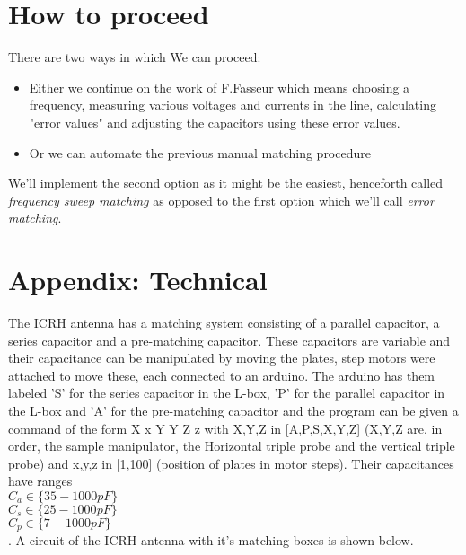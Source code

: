 \section{How to proceed}
There are two ways in which We can proceed:
\begin{itemize}
	\item Either we continue on the work of F.Fasseur which means
		choosing a frequency, measuring various voltages and currents in the line,
		calculating "error values" and adjusting the capacitors using these error values.
	\item Or we can automate the previous manual matching procedure
\end{itemize}
We'll implement the second option as it might be the easiest, henceforth called \textit{frequency sweep matching} as opposed to the first option which we'll call \textit{error matching}.

\section{Appendix: Technical}
The ICRH antenna has a matching system consisting of a parallel capacitor, a
series capacitor and a pre-matching capacitor. These capacitors are variable
and their capacitance can be manipulated by moving the plates, step motors were
attached to move these, each connected to an arduino. The arduino has them
labeled 'S' for the series capacitor in the L-box, 'P' for the parallel
capacitor in the L-box and 'A' for the pre-matching capacitor and the program
can be given a command of the form X x Y Y Z z with X,Y,Z in [A,P,S,X,Y,Z]
(X,Y,Z are, in order, the sample manipulator, the Horizontal triple probe and
the vertical triple probe) and x,y,z in [1,100] (position of plates in motor
steps). Their capacitances have ranges\\ 
$C_a \in \{35-1000pF\}$\\
$C_s \in \{25-1000pF\}$\\
$C_p \in \{7-1000pF\}$\\
. A circuit of
the ICRH antenna with it's matching boxes is shown below. 

